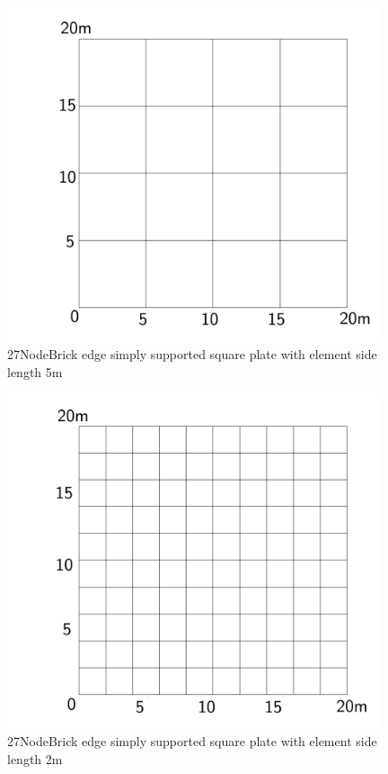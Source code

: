 \documentclass[fleqn,11pt]{article}
\begin{document}
\newpage

\begin{figure}[H]
  \centering
  \includegraphics[width=11cm]{../Figure-files/square_plate2.pdf}
  \caption{27NodeBrick edge simply supported square plate with element side length 5m }
  \label{fig 27NodeBrick edges simply supported square plate with element side length 5m }
\end{figure}


\begin{figure}[H]
  \centering
  \includegraphics[width=11cm]{../Figure-files/square_plate3.pdf}
  \caption{27NodeBrick edge simply supported square plate with element side length 2m }
  \label{fig 27NodeBrick edges simply supported square plate with element side length 2m }
\end{figure}
\end{document}
